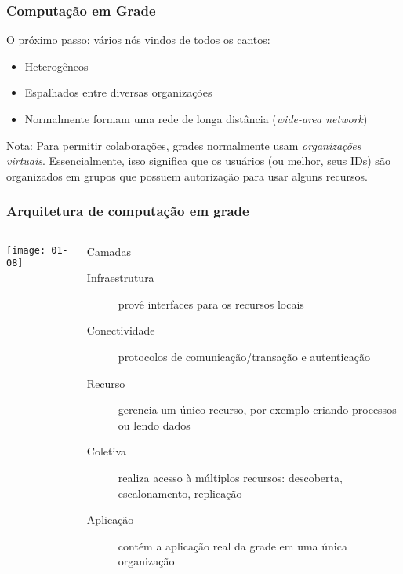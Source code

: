 \documentclass[Ligatures=TeX,table,brazil,svgnames,usetotalslideindicator,compress,10pt]{beamer}
\begin{document}
\begin{frame}
  \frametitle{Computação em Grade}


  \begin{block}{O próximo passo: vários nós vindos de todos os cantos:}
  \begin{itemize}
  \item Heterogêneos
  \item Espalhados entre diversas organizações
  \item Normalmente formam uma rede de longa distância (\textit{wide-area network})
  \end{itemize}
\end{block}

  \begin{alertblock}{Nota:}
    Para permitir colaborações, grades normalmente usam
    \emph{organizações virtuais}. Essencialmente, isso significa que
    os usuários (ou melhor, seus IDs) são organizados em grupos que
    possuem autorização para usar alguns recursos.
  \end{alertblock}

\end{frame}

\begin{frame}
  \frametitle{Arquitetura de computação em grade}
  \begin{columns}
    \begin{column}{0.4\textwidth}
      \texttt{[image: 01-08]}
    \end{column}
    \quad
    \small
        \begin{column}{0.6\textwidth}
          \begin{block}{Camadas}
            \begin{description}
            \item[Infraestrutura] provê interfaces para os recursos locais
            \item[Conectividade] protocolos de comunicação/transação e autenticação
            \item[Recurso] gerencia um único recurso, por exemplo criando processos ou lendo dados
            \item[Coletiva] realiza acesso à múltiplos recursos: descoberta, escalonamento, replicação
            \item[Aplicação] contém a aplicação real da grade em uma única organização
            \end{description}
          \end{block}
    \end{column}
  \end{columns}
\end{frame}
\end{document}
